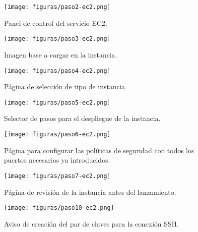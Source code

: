 \documentclass{scrbook}
\begin{document}
\begin{figure}[htb] 
\begin{center}
\label{fig:paso2-ec2}
\texttt{[image: figuras/paso2-ec2.png]}
\caption{Panel de control del servicio EC2.} 
\end{center}
\end{figure}

\begin{figure}[htb] 
\begin{center}
\label{fig:paso3-ec2}
\texttt{[image: figuras/paso3-ec2.png]}
\caption{Imagen base a cargar en la instancia.} 
\end{center}
\end{figure}

\begin{figure}[htb] 
\begin{center}
\label{fig:paso4-ec2}
\texttt{[image: figuras/paso4-ec2.png]}
\caption{Página de selección de tipo de instancia.} 
\end{center}
\end{figure}

\begin{figure}[htb] 
\begin{center}
\label{fig:paso5-ec2}
\texttt{[image: figuras/paso5-ec2.png]}
\caption{Selector de pasos para el despliegue de la instancia.} 
\end{center}
\end{figure}

\begin{figure}[htb] 
\begin{center}
\label{fig:paso6-ec2}
\texttt{[image: figuras/paso6-ec2.png]}
\caption{Página para configurar las políticas de seguridad con todos los puertos necesarios ya introducidos.} 
\end{center}
\end{figure}

\begin{figure}[htb] 
\begin{center}
\label{fig:paso7-ec2}
\texttt{[image: figuras/paso7-ec2.png]}
\caption{Página de revisión de la instancia antes del lanzamiento.} 
\end{center}
\end{figure}

\begin{figure}[htb]  
\begin{center}
\texttt{[image: figuras/paso10-ec2.png]}
\caption{Aviso de creación del par de claves para la conexión SSH.} 
\label{fig:paso10-ec2}
\end{center}
\end{figure}
\end{document}
